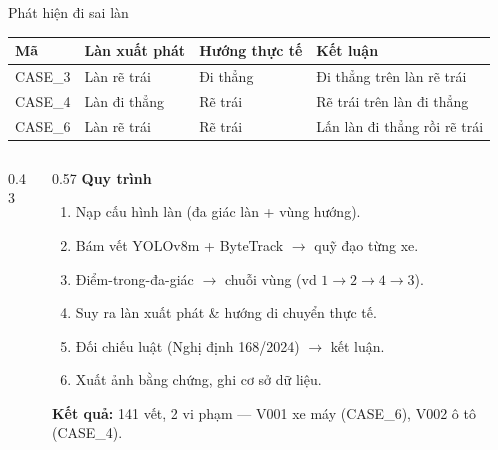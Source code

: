 \documentclass[aspectratio=169,9pt]{beamer}
\begin{document}
\begin{frame}{Phát hiện đi sai làn}
\begin{table}\centering\scriptsize
\begin{tabular}{llll}
\toprule
\textbf{Mã} & \textbf{Làn xuất phát} & \textbf{Hướng thực tế} & \textbf{Kết luận} \\
\midrule
CASE\_3 & Làn rẽ trái & Đi thẳng & Đi thẳng trên làn rẽ trái \\
CASE\_4 & Làn đi thẳng & Rẽ trái & Rẽ trái trên làn đi thẳng \\
CASE\_6 & Làn rẽ trái & Rẽ trái & Lấn làn đi thẳng rồi rẽ trái \\
\bottomrule
\end{tabular}
\end{table}
\begin{columns}[T]
\begin{column}{0.43\textwidth}
\begin{center}
\end{center}
\end{column}
\begin{column}{0.57\textwidth}
\textbf{Quy trình}
\begin{enumerate}\scriptsize
  \item Nạp cấu hình làn (đa giác làn + vùng hướng).
  \item Bám vết YOLOv8m + ByteTrack $\to$ quỹ đạo từng xe.
  \item Điểm-trong-đa-giác $\to$ chuỗi vùng (vd $1\!\to\!2\!\to\!4\!\to\!3$).
  \item Suy ra làn xuất phát \& hướng di chuyển thực tế.
  \item Đối chiếu luật (Nghị định 168/2024) $\to$ kết luận.
  \item Xuất ảnh bằng chứng, ghi cơ sở dữ liệu.
\end{enumerate}
{\scriptsize\textbf{Kết quả:} 141 vết, 2 vi phạm --- V001 xe máy (CASE\_6), V002 ô tô (CASE\_4).}
\end{column}
\end{columns}
\end{frame}
\end{document}
